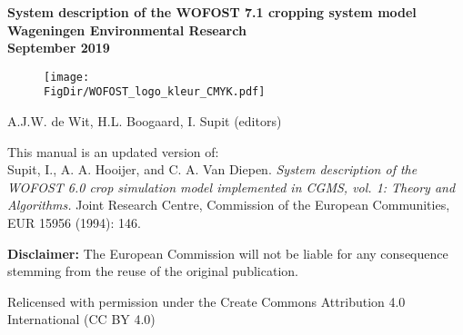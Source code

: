 \documentclass[a4paper,12pt,oneside]{book}
\newcommand{\FigDir}{D:/UserData/sources/WOFOST_system_docs/latex/figs}
\begin{document}
\frontmatter
\begin{titlepage}
	\centering
	\vfill
	{\bfseries
		{\LARGE
		System description of the WOFOST 7.1 cropping system model}\\
		\vskip0.5cm
		{\large
			Wageningen Environmental Research\\ 
   	        \vskip0.5cm
			September 2019}\\

		\begin{figure}[h]
		\texttt{[image: \\FigDir/WOFOST\_logo\_kleur\_CMYK.pdf]}
	    \end{figure}
		\vskip1cm

		{\large A.J.W. de Wit, H.L. Boogaard, I. Supit (editors)}\\
		\vskip0.5cm
     }
     {\small 

	This manual is an updated version of:\\
    Supit, I., A. A. Hooijer, and C. A. Van Diepen. 
	\textit{System description of the WOFOST 6.0 crop simulation model implemented in CGMS, vol. 1: 
    Theory and Algorithms.} Joint Research Centre, Commission of the European Communities, EUR 15956 
             (1994): 146.
             
    \textbf{Disclaimer:} The European Commission will not be liable for any consequence stemming from the reuse of the
     original publication.
     
    Relicensed with permission under the Create Commons Attribution 4.0 International (CC BY 4.0)
    }
\end{titlepage}
\tableofcontents
\listoffigures
\listoftables
\cleardoublepage

\mainmatter





%
%
%
%

\backmatter
\appendix



\end{document}
